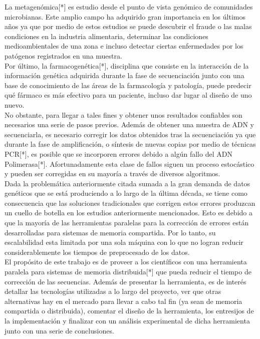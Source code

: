 \documentclass[conference]{IEEEtran}
\begin{document}
La metagenómica[*] es estudio desde el punto de vista genómico de comunidades microbianas. Este amplio campo ha adquirido gran importancia en los últimos años ya que por medio de estos estudios se puede descubrir el fraude o las malas condiciones en la industria alimentaria, determinar las condiciones medioambientales de una zona e incluso detectar ciertas enfermedades por los patógenos registrados en una muestra.\\
Por último, la farmacogenética[*], disciplina que consiste en la interacción de la información genética adquirida durante la fase de secuenciación junto con una base de conocimiento de las áreas de la farmacología y patología, puede predecir qué fármaco es más efectivo para un paciente, incluso dar lugar al diseño de uno nuevo.
\\

No obstante, para llegar a tales fines y obtener unos resultados confiables son necesarios una serie de pasos previos. Además de obtener una muestra de ADN y secuenciarla, es necesario corregir los datos obtenidos tras la secuenciación ya que durante la fase de amplificación, o síntesis de nuevas copias por medio de técnicas PCR[*], es posible que se incorporen errores debido a algún fallo del ADN Polimerasa[*]. Afortunadamente esta clase de fallos siguen un proceso estocástico y pueden ser corregidas en su mayoría a través de diversos algoritmos.
\\

Dada la problemática anteriormente citada sumada a la gran demanda de datos genéticos que se está produciendo a lo largo de la última década, se tiene como consecuencia que las soluciones tradicionales que corrigen estos errores produzcan un cuello de botella en los estudios anteriormente mencionados. Esto es debido a que la mayoría de las herramientas paralelas para la corrección de errores están desarrolladas para sistemas de memoria compartida. Por lo tanto, su escalabilidad esta limitada por una sola máquina con lo que no logran reducir considerablemente los tiempos de preprocesado de los datos.
\\

El propósito de este trabajo es de proveer a los científicos con una herramienta paralela para sistemas de memoria distribuida[*] que pueda reducir el tiempo de corrección de las secuencias. Además de presentar la herramienta, es de interés detallar las tecnologías utilizadas a lo largo del proyecto, ver que otras alternativas hay en el mercado para llevar a cabo tal fin (ya sean de memoria compartida o distribuida), comentar el diseño de la herramienta, los entresijos de la implementación y finalizar con un análisis experimental de dicha herramienta junto con una serie de conclusiones.\\
\end{document}
